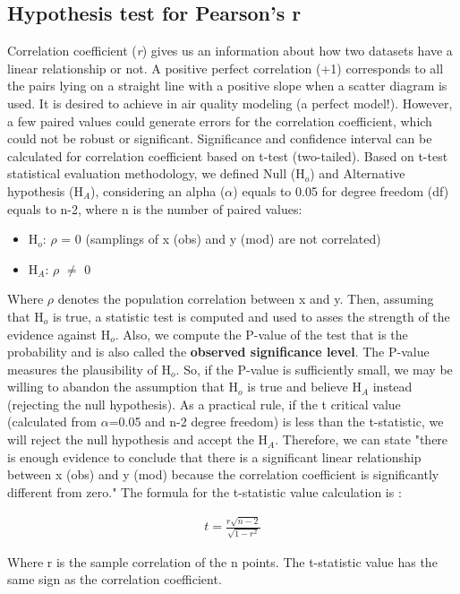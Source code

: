  \subsection{Hypothesis test for Pearson's r}
 Correlation coefficient (\textit{r}) gives us an information about how two datasets have a linear relationship or not.
  A positive perfect correlation (+1) corresponds to all the pairs lying on a straight line with a positive slope when a scatter diagram is used.
  It is desired to achieve in air quality modeling (a perfect model!). However, a few paired values could generate errors for the correlation coefficient, which could not be robust or significant.
  Significance and confidence interval can be calculated for correlation coefficient based on t-test (two-tailed).
   Based on \citet{Navidi2019} t-test statistical evaluation methodology, we defined Null (H$_o$) and Alternative hypothesis (H$_A$), considering an alpha ($\alpha$) equals to 0.05 for degree freedom (df) equals to n-2, where n is the number of paired values:
  \begin{itemize}
  	\item H$_o$: $\rho$ = 0 (samplings of x (obs) and y (mod) are not correlated)
  	\item H$_A$: $\rho$ $\neq$ 0
  \end{itemize}
  Where $\rho$ denotes the population correlation between x and y.
  Then, assuming that H$_o$ is true, a statistic test is computed and used to asses the strength of the evidence against H$_o$.
  Also, we compute the P-value of the test that is the probability and is also called the \textbf{observed significance level}.
  The P-value measures the plausibility of H$_o$.
  So, if the P-value is sufficiently small, we may be willing to abandon the assumption that H$_o$ is true and believe H$_A$ instead (rejecting the null hypothesis).
  As a practical rule, if the t critical value (calculated from $\alpha$=0.05 and n-2 degree freedom) is less than the t-statistic, we will reject the null hypothesis and accept the H$_A$.
  Therefore, we can state "there is enough evidence to conclude that there is a significant linear relationship between x (obs) and y (mod) because the correlation coefficient is significantly different from zero."
  The formula for the t-statistic value calculation is \citep{Navidi2019}:
  
  \begin{align}
  	t = \frac{r\sqrt{n-2}}{\sqrt{1-r^2}}
  \end{align}
  
  Where r is the sample correlation of the n points. 
  The t-statistic value has the same sign as the correlation coefficient.






  
  
  